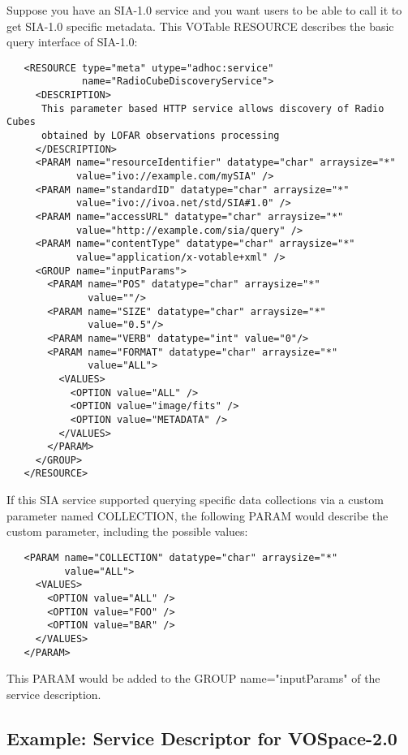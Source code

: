 \documentclass[11pt,a4paper]{ivoa}
\newcommand{\attval}[2]{#1={\allowbreak}{"}#2{"}}
\begin{document}
Suppose you have an SIA-1.0 service and you want users to be able to
call it to get SIA-1.0 specific metadata. This VOTable RESOURCE describes
the basic query interface of SIA-1.0:
\begin{verbatim}
   <RESOURCE type="meta" utype="adhoc:service" 
             name="RadioCubeDiscoveryService">
     <DESCRIPTION> 
      This parameter based HTTP service allows discovery of Radio Cubes 
      obtained by LOFAR observations processing 
     </DESCRIPTION>
     <PARAM name="resourceIdentifier" datatype="char" arraysize="*"
            value="ivo://example.com/mySIA" />
     <PARAM name="standardID" datatype="char" arraysize="*"
            value="ivo://ivoa.net/std/SIA#1.0" />
     <PARAM name="accessURL" datatype="char" arraysize="*"
            value="http://example.com/sia/query" />
     <PARAM name="contentType" datatype="char" arraysize="*" 
            value="application/x-votable+xml" />
     <GROUP name="inputParams">
       <PARAM name="POS" datatype="char" arraysize="*"
              value=""/>
       <PARAM name="SIZE" datatype="char" arraysize="*"
              value="0.5"/>
       <PARAM name="VERB" datatype="int" value="0"/>
       <PARAM name="FORMAT" datatype="char" arraysize="*"
              value="ALL">
         <VALUES>
           <OPTION value="ALL" />
           <OPTION value="image/fits" />
           <OPTION value="METADATA" />
         </VALUES>
       </PARAM>
     </GROUP>
   </RESOURCE>
\end{verbatim}

If this SIA service supported querying specific data collections via
a custom parameter named COLLECTION, the following PARAM would describe the
custom parameter, including the possible values:
\begin{verbatim}
   <PARAM name="COLLECTION" datatype="char" arraysize="*"
          value="ALL">
     <VALUES>
       <OPTION value="ALL" />
       <OPTION value="FOO" />
       <OPTION value="BAR" />
     </VALUES>
   </PARAM>
\end{verbatim}
This PARAM would be added to the GROUP \attval{name}{inputParams}
of the service description.


\subsection{Example: Service Descriptor for VOSpace-2.0}
\end{document}
